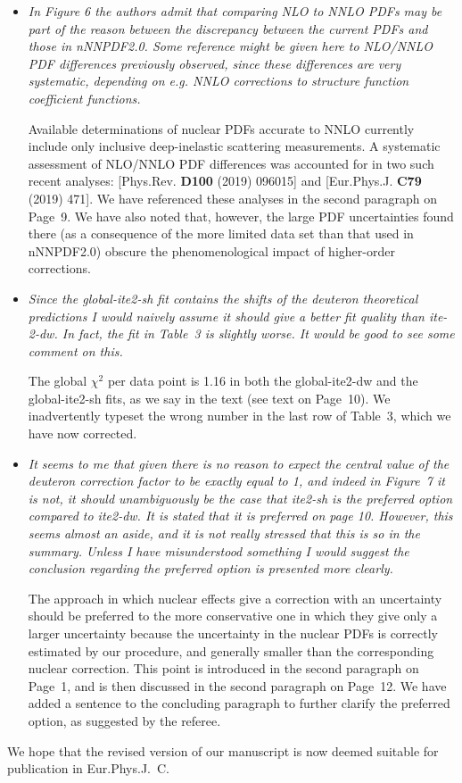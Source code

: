 \documentclass[a4paper,11pt]{article}
\begin{document}
\begin{itemize}
\item {\it In Figure 6 the authors admit that comparing NLO to NNLO PDFs may be
  part of the reason between the discrepancy between the current PDFs and those
  in nNNPDF2.0. Some reference might be given here to NLO/NNLO PDF differences
  previously observed, since these differences are very systematic, depending
  on e.g. NNLO corrections to structure function coefficient functions.}

  Available determinations of nuclear PDFs accurate to NNLO currently include
  only inclusive deep-inelastic scattering measurements. A systematic
  assessment of NLO/NNLO PDF differences was accounted for in two such recent
  analyses: [Phys.Rev. {\bf D100} (2019) 096015] and [Eur.Phys.J. {\bf C79}
    (2019) 471]. We have referenced these analyses in the second 
  paragraph on Page~9. We have also noted that, however, the large PDF
  uncertainties found there (as a consequence of the more limited
  data set than that used in nNNPDF2.0) obscure the phenomenological
  impact of higher-order corrections. 

\item {\it  Since the global-ite2-sh fit contains the shifts of the deuteron
  theoretical predictions I would naively assume it should give a better fit
  quality than ite-2-dw. In fact, the fit in Table~3 is slightly worse. It would
  be good to see some comment on this.}

  The global $\chi^2$ per data point is 1.16 in both the global-ite2-dw and the
  global-ite2-sh fits, as we say in the text (see text on Page~10).
  We inadvertently typeset the wrong number in the last row of Table~3, which we
  have now corrected.

\item {\it It seems to me that given there is no reason to expect the central
  value of the deuteron correction factor to be exactly equal to 1, and indeed
  in Figure~7 it is not, it should unambiguously be the case that ite2-sh is
  the preferred option compared to ite2-dw. It is stated that it is preferred
  on page 10. However, this seems almost an aside, and it is not really
  stressed that this is so in the summary. Unless I have misunderstood
  something I would suggest the conclusion regarding the preferred option
  is presented more clearly.}

  The approach in which nuclear effects give a correction
  with an uncertainty should be preferred to the more conservative one in
  which they give only a larger uncertainty because the uncertainty in the
  nuclear PDFs is correctly estimated by our procedure, and generally smaller
  than the corresponding nuclear correction. This point is introduced in the
  second paragraph on Page~1, and is then discussed in the second paragraph
  on Page~12. We have added a sentence to the concluding paragraph to
  further clarify the preferred option, as suggested by the referee.
  
\end{itemize}  

\noindent We hope that the revised version of our manuscript is now deemed
suitable for publication in Eur.Phys.J.~C.
\end{document}
